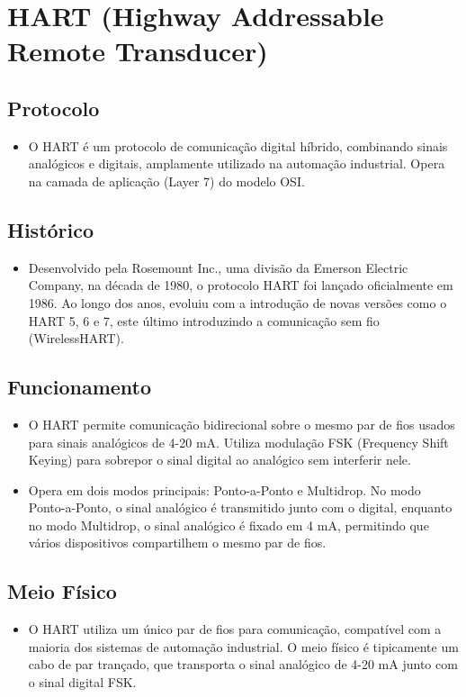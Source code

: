 \documentclass[a4paper,11pt]{article} %
\begin{document}
\newpage

\section{HART (Highway Addressable Remote Transducer)}

\subsection{Protocolo}
\begin{itemize}
    \item O HART é um protocolo de comunicação digital híbrido, combinando sinais analógicos e digitais, amplamente utilizado na automação industrial. Opera na camada de aplicação (Layer 7) do modelo OSI.
\end{itemize}

\subsection{Histórico}
\begin{itemize}
    \item Desenvolvido pela Rosemount Inc., uma divisão da Emerson Electric Company, na década de 1980, o protocolo HART foi lançado oficialmente em 1986. Ao longo dos anos, evoluiu com a introdução de novas versões como o HART 5, 6 e 7, este último introduzindo a comunicação sem fio (WirelessHART).
\end{itemize}

\subsection{Funcionamento}
\begin{itemize}
    \item O HART permite comunicação bidirecional sobre o mesmo par de fios usados para sinais analógicos de 4-20 mA. Utiliza modulação FSK (Frequency Shift Keying) para sobrepor o sinal digital ao analógico sem interferir nele.
    \item Opera em dois modos principais: Ponto-a-Ponto e Multidrop. No modo Ponto-a-Ponto, o sinal analógico é transmitido junto com o digital, enquanto no modo Multidrop, o sinal analógico é fixado em 4 mA, permitindo que vários dispositivos compartilhem o mesmo par de fios.
\end{itemize}

\subsection{Meio Físico}
\begin{itemize}
    \item O HART utiliza um único par de fios para comunicação, compatível com a maioria dos sistemas de automação industrial. O meio físico é tipicamente um cabo de par trançado, que transporta o sinal analógico de 4-20 mA junto com o sinal digital FSK.
\end{itemize}
\end{document}
